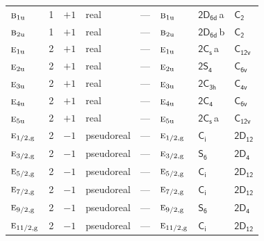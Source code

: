 \documentclass[10pt,a4paper]{article}
\makeatletter
\def\grouprule#1#2{\noalign{\marks\LTgroupmarks{\the\belowrulesep}\nobreak\vskip#1%
  \vskip\aboverulesep}\multispan\LT@cols\unskip{\leaders\hrule\@height#2\hfill\kern\z@}\cr
  \noalign{\penalty\LTrulebreak\vskip\belowrulesep\global\@lastruleclass\z@}}
\numberwithin{equation}{section}
\newcommand{\grp}[1]{\mathsf{#1}}
\newcommand{\irr}[1]{\text{\normalfont\scshape #1}}
\newcommand{\ptag}[1]{\mathrm{#1}}
\newcommand{\clsletter}[1]{\,{\scriptsize\color{black!55}#1}}
\makeatother
\begin{document}
{\begin{longtable}{@{}lrrlllll@{}}
$\irr{b}_{1\ptag{u}}$ & 1 & $+1$ & real & --- & $\irr{b}_{1\ptag{u}}$ & \href{2D6d.pdf}{$\grp{2D_{6d}}$}\clsletter{a} & \href{../../../rotation/data/pdf/C2.pdf}{$\grp{C_{2}}$}\\
$\irr{b}_{2\ptag{u}}$ & 1 & $+1$ & real & --- & $\irr{b}_{2\ptag{u}}$ & \href{2D6d.pdf}{$\grp{2D_{6d}}$}\clsletter{b} & \href{../../../rotation/data/pdf/C2.pdf}{$\grp{C_{2}}$}\\
$\irr{e}_{1\ptag{u}}$ & 2 & $+1$ & real & --- & $\irr{e}_{1\ptag{u}}$ & \href{2C1v.pdf}{$\grp{2C_{s}}$}\clsletter{a} & \href{../../../rotation/data/pdf/C12v.pdf}{$\grp{C_{12v}}$}\\
$\irr{e}_{2\ptag{u}}$ & 2 & $+1$ & real & --- & $\irr{e}_{2\ptag{u}}$ & \href{2S4.pdf}{$\grp{2S_{4}}$} & \href{../../../rotation/data/pdf/C6v.pdf}{$\grp{C_{6v}}$}\\
$\irr{e}_{3\ptag{u}}$ & 2 & $+1$ & real & --- & $\irr{e}_{3\ptag{u}}$ & \href{2C3h.pdf}{$\grp{2C_{3h}}$} & \href{../../../rotation/data/pdf/C4v.pdf}{$\grp{C_{4v}}$}\\
$\irr{e}_{4\ptag{u}}$ & 2 & $+1$ & real & --- & $\irr{e}_{4\ptag{u}}$ & \href{2C4.pdf}{$\grp{2C_{4}}$} & \href{../../../rotation/data/pdf/C6v.pdf}{$\grp{C_{6v}}$}\\
$\irr{e}_{5\ptag{u}}$ & 2 & $+1$ & real & --- & $\irr{e}_{5\ptag{u}}$ & \href{2C1v.pdf}{$\grp{2C_{s}}$}\clsletter{a} & \href{../../../rotation/data/pdf/C12v.pdf}{$\grp{C_{12v}}$}\\
\grouprule{0pt}{\lightrulewidth}
$\irr{e}_{1/2,\ptag{g}}$ & 2 & $-1$ & pseudoreal & --- & $\irr{e}_{1/2,\ptag{g}}$ & \href{S2.pdf}{$\grp{C_{i}}$} & \href{2D12.pdf}{$\grp{2D_{12}}$}\\
$\irr{e}_{3/2,\ptag{g}}$ & 2 & $-1$ & pseudoreal & --- & $\irr{e}_{3/2,\ptag{g}}$ & \href{S6.pdf}{$\grp{S_{6}}$} & \href{2D4.pdf}{$\grp{2D_{4}}$}\\
$\irr{e}_{5/2,\ptag{g}}$ & 2 & $-1$ & pseudoreal & --- & $\irr{e}_{5/2,\ptag{g}}$ & \href{S2.pdf}{$\grp{C_{i}}$} & \href{2D12.pdf}{$\grp{2D_{12}}$}\\
$\irr{e}_{7/2,\ptag{g}}$ & 2 & $-1$ & pseudoreal & --- & $\irr{e}_{7/2,\ptag{g}}$ & \href{S2.pdf}{$\grp{C_{i}}$} & \href{2D12.pdf}{$\grp{2D_{12}}$}\\
$\irr{e}_{9/2,\ptag{g}}$ & 2 & $-1$ & pseudoreal & --- & $\irr{e}_{9/2,\ptag{g}}$ & \href{S6.pdf}{$\grp{S_{6}}$} & \href{2D4.pdf}{$\grp{2D_{4}}$}\\
$\irr{e}_{11/2,\ptag{g}}$ & 2 & $-1$ & pseudoreal & --- & $\irr{e}_{11/2,\ptag{g}}$ & \href{S2.pdf}{$\grp{C_{i}}$} & \href{2D12.pdf}{$\grp{2D_{12}}$}\\

\end{longtable}}
\end{document}
